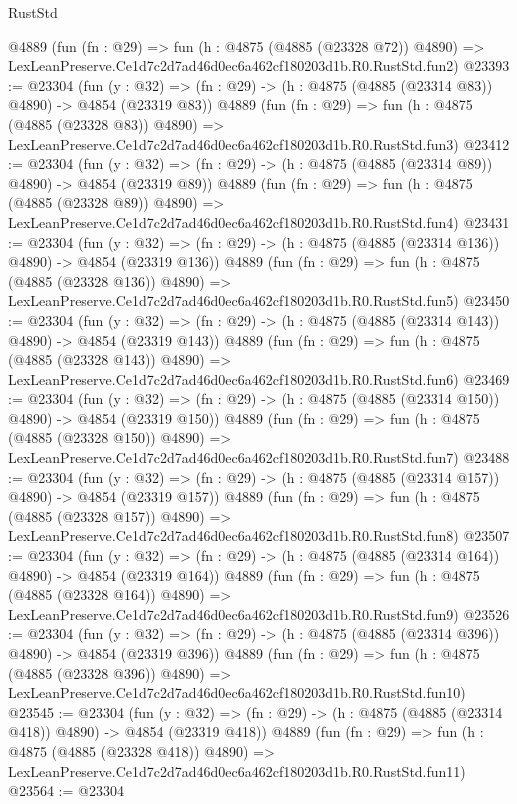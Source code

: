 \begin{lexlean}{RustStd}
\begin{coremodule}
    @4889
    (fun (fn : @29) =>
    fun (h : @4875 (@4885 (@23328 @72)) @4890) =>
    LexLeanPreserve.Ce1d7c2d7ad46d0ec6a462cf180203d1b.R0.RustStd.fun2)
@23393 := @23304
    (fun (y : @32) => (fn : @29) -> (h : @4875 (@4885 (@23314 @83)) @4890) -> @4854 (@23319 @83))
    @4889
    (fun (fn : @29) =>
    fun (h : @4875 (@4885 (@23328 @83)) @4890) =>
    LexLeanPreserve.Ce1d7c2d7ad46d0ec6a462cf180203d1b.R0.RustStd.fun3)
@23412 := @23304
    (fun (y : @32) => (fn : @29) -> (h : @4875 (@4885 (@23314 @89)) @4890) -> @4854 (@23319 @89))
    @4889
    (fun (fn : @29) =>
    fun (h : @4875 (@4885 (@23328 @89)) @4890) =>
    LexLeanPreserve.Ce1d7c2d7ad46d0ec6a462cf180203d1b.R0.RustStd.fun4)
@23431 := @23304
    (fun (y : @32) => (fn : @29) -> (h : @4875 (@4885 (@23314 @136)) @4890) -> @4854 (@23319 @136))
    @4889
    (fun (fn : @29) =>
    fun (h : @4875 (@4885 (@23328 @136)) @4890) =>
    LexLeanPreserve.Ce1d7c2d7ad46d0ec6a462cf180203d1b.R0.RustStd.fun5)
@23450 := @23304
    (fun (y : @32) => (fn : @29) -> (h : @4875 (@4885 (@23314 @143)) @4890) -> @4854 (@23319 @143))
    @4889
    (fun (fn : @29) =>
    fun (h : @4875 (@4885 (@23328 @143)) @4890) =>
    LexLeanPreserve.Ce1d7c2d7ad46d0ec6a462cf180203d1b.R0.RustStd.fun6)
@23469 := @23304
    (fun (y : @32) => (fn : @29) -> (h : @4875 (@4885 (@23314 @150)) @4890) -> @4854 (@23319 @150))
    @4889
    (fun (fn : @29) =>
    fun (h : @4875 (@4885 (@23328 @150)) @4890) =>
    LexLeanPreserve.Ce1d7c2d7ad46d0ec6a462cf180203d1b.R0.RustStd.fun7)
@23488 := @23304
    (fun (y : @32) => (fn : @29) -> (h : @4875 (@4885 (@23314 @157)) @4890) -> @4854 (@23319 @157))
    @4889
    (fun (fn : @29) =>
    fun (h : @4875 (@4885 (@23328 @157)) @4890) =>
    LexLeanPreserve.Ce1d7c2d7ad46d0ec6a462cf180203d1b.R0.RustStd.fun8)
@23507 := @23304
    (fun (y : @32) => (fn : @29) -> (h : @4875 (@4885 (@23314 @164)) @4890) -> @4854 (@23319 @164))
    @4889
    (fun (fn : @29) =>
    fun (h : @4875 (@4885 (@23328 @164)) @4890) =>
    LexLeanPreserve.Ce1d7c2d7ad46d0ec6a462cf180203d1b.R0.RustStd.fun9)
@23526 := @23304
    (fun (y : @32) => (fn : @29) -> (h : @4875 (@4885 (@23314 @396)) @4890) -> @4854 (@23319 @396))
    @4889
    (fun (fn : @29) =>
    fun (h : @4875 (@4885 (@23328 @396)) @4890) =>
    LexLeanPreserve.Ce1d7c2d7ad46d0ec6a462cf180203d1b.R0.RustStd.fun10)
@23545 := @23304
    (fun (y : @32) => (fn : @29) -> (h : @4875 (@4885 (@23314 @418)) @4890) -> @4854 (@23319 @418))
    @4889
    (fun (fn : @29) =>
    fun (h : @4875 (@4885 (@23328 @418)) @4890) =>
    LexLeanPreserve.Ce1d7c2d7ad46d0ec6a462cf180203d1b.R0.RustStd.fun11)
@23564 := @23304

\end{coremodule}
\end{lexlean}
